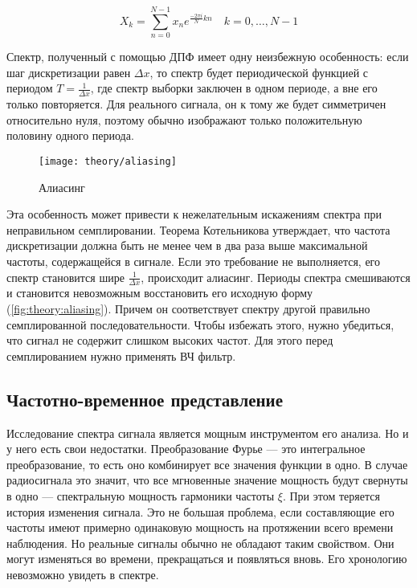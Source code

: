 \begin{equation}
  \label{eq:theory:discrete_fourier}
  X_k = \sum_{n=0}^{N-1} x_n e^{\frac{-2 \pi i}{N} k n} \quad k = 0, \dotsc, N-1
\end{equation}

Спектр, полученный с помощью ДПФ имеет одну неизбежную особенность: если шаг дискретизации равен $\Delta x$, то спектр будет периодической функцией с периодом $T = \frac{1}{\Delta x}$, где спектр выборки заключен в одном периоде, а вне его только повторяется. Для реального сигнала, он к тому же будет симметричен относительно нуля, поэтому обычно изображают только положительную половину одного периода.

\begin{figure}[h]
  \centering
  \texttt{[image: theory/aliasing]}
  \caption{Алиасинг}
  \label{fig:theory:aliasing}
\end{figure}

Эта особенность может привести к нежелательным искажениям спектра при неправильном семплировании. Теорема Котельникова утверждает, что частота дискретизации должна быть не менее чем в два раза выше максимальной частоты, содержащейся в сигнале. Если это требование не выполняется, его спектр становится шире $\frac{1}{\Delta x}$, происходит алиасинг. Периоды спектра смешиваются и становится невозможным восстановить его исходную форму (\autoref{fig:theory:aliasing}). Причем он соответствует спектру другой правильно семплированной последовательности. Чтобы избежать этого, нужно убедиться, что сигнал не содержит слишком высоких частот. Для этого перед семплированием нужно применять ВЧ фильтр.


\subsection{Частотно-временное представление}

Исследование спектра сигнала является мощным инструментом его анализа. Но и у него есть свои недостатки. Преобразование Фурье --- это интегральное преобразование, то есть оно комбинирует все значения функции в одно. В случае радиосигнала это значит, что все мгновенные значение мощность будут свернуты в одно --- спектральную мощность гармоники частоты $\xi$. При этом теряется история изменения сигнала. Это не большая проблема, если составляющие его частоты имеют примерно одинаковую мощность на протяжении всего времени наблюдения. Но реальные сигналы обычно не обладают таким свойством. Они могут изменяться во времени, прекращаться и появляться вновь. Его хронологию невозможно увидеть в спектре. \cite{cohen_tfa}

